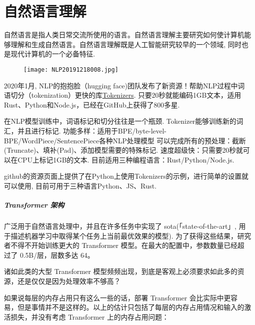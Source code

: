 \chapter{自然语言理解}\label{SSPChapter8}
\begin{tcolorbox}[colback=white!50,colframe=orange!50,title=自然语言]
\begin{center}
自然语言是指人类日常交流所使用的语言。自然语言理解主要研究如何使计算机能够理解和生成自然语言。自然语言理解既是人工智能研究较早的一个领域, 同时也是现代计算机的一个必备特征. \hfill
\end{center}
\end{tcolorbox}
\begin{figure}[H]
\centering
\texttt{[image: NLP20191218008.jpg]}
\caption{}
\label{NLP20191218008}
\end{figure}
2020年1月, NLP的抱抱脸（hugging face)团队发布了新资源！帮助NLP过程中词语切分（tokenization）更快的库\href{https://github.com/huggingface/tokenizers}{Tokenizers}.
只要20秒就能编码1GB文本，适用Rust、Python和Node.js，已经在GitHub上获得了800多星.

在NLP模型训练中，词语标记和切分往往是一个瓶颈. Tokenizer能够训练新的词汇，并且进行标记.
功能多样：适用于BPE/byte-level-BPE/WordPiece/SentencePiece各种NLP处理模型
可以完成所有的预处理：截断(Truncate)、填补(Pad)、添加模型需要的特殊标记.
速度超级快：只需要20秒就可以在CPU上标记1GB的文本.
目前适用三种编程语言：Rust/Python/Node.js.

github的资源页面上提供了在Python上使用Tokenizers的示例，进行简单的设置就可以使用, 目前可用于三种语言Python、JS、Rust.
\paragraph{Transformer 架构}
广泛用于自然语言处理中，并且在许多任务中实现了 sota(「state-of-the-art」, 用于描述机器学习中取得某个任务上当前最优效果的模型). 为了获得这些结果，研究者不得不开始训练更大的 Transformer 模型。在最大的配置中，参数数量已经超过了 0.5B/层，层数多达 64。

诸如此类的大型 Transformer 模型频频出现，到底是客观上必须要求如此多的资源，还是仅仅是因为处理效率不够高？

如果说每层的内存占用只有这么一些的话，部署 Transformer 会比实际中更容易，但是事情并不是这样的。以上的估计只包括了每层的内存占用情况和输入的激活损失，并没有考虑 Transformer 上的内存占用问题：


